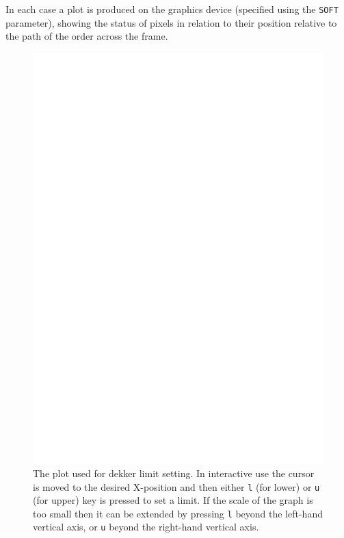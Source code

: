 \documentclass[11pt,twoside]{article}
\newcommand{\sunspec}[2]{#1}
\renewcommand{\sunspec}[2]{#2}
\begin{document}
In each case a plot is produced on the graphics device (specified using
the \texttt{SOFT} parameter), showing the status of pixels in relation to their
position relative to the path of the order across the frame.

\begin{figure}
\begin{center}
\includegraphics[width=\textwidth]{sun152_04.eps}

\parbox{140mm}{
\caption{The plot used for dekker limit setting. In interactive use
the cursor is moved to the desired X-position and then either {\tt l}
(for lower) or {\tt u} (for upper) key is pressed to set a limit. If
the scale of the graph is too small then it can be extended by
pressing {\tt l} beyond the left-hand vertical axis, or {\tt u}
beyond the right-hand vertical axis.}
\label{fi_dekker}
}
\end{center}
\end{figure}
\end{document}
